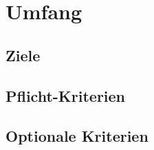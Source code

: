 %
%


\chapter{Umfang}
\label{Umfang}


\section{Ziele}

\section{Pflicht-Kriterien}

\section{Optionale Kriterien}

